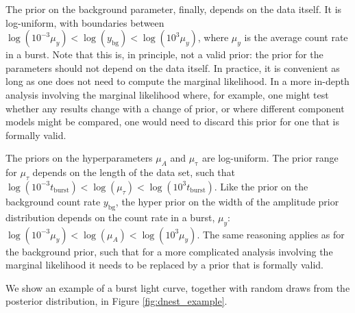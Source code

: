 \documentclass[12pt]{emulateapj}
\newcommand{\given}{\,|\,}
\newcommand{\counts}{y}
\newcommand{\pars}{\theta}
\newcommand{\mean}{\lambda}
\newcommand{\Poisson}{{\mathcal P}}
\newcommand{\bg}{\mathrm{bg}}
\begin{document}

The prior on the background parameter, finally, depends on the data itself. It is log-uniform, with boundaries between 
$\log{(10^{-3}\mu_\counts)} < \log{(\counts_{\mathrm{bg}})} < \log{(10^{3} \mu_\counts)}$, where $\mu_\counts$ is the average count
rate in a burst. Note that this is, in principle, not a valid prior: the prior for the parameters should not depend on the data
itself. In practice, it is convenient as long as one does not need to compute the marginal likelihood. In a more in-depth analysis
involving the marginal likelihood where, for example, one might test whether any results change with a change of prior, or where different component models
might be compared, one would need to discard this prior for one that is formally valid.

The priors on the hyperparameters $\mu_{A}$ and $\mu_{\mathrm{\tau}}$ are log-uniform. The prior range for
$\mu_{\tau}$ depends on the length of the data set, such that $\log{(10^{-3}t_{\mathrm{burst}})} < \log{(\mu_{\tau})} < \log{(10^{3}t_\mathrm{burst})}$.
Like the prior on the background count rate $\counts_{\mathrm{bg}}$, the hyper prior on the width of the amplitude prior distribution
depends on the count rate in a burst, $\mu_\counts$: $\log{(10^{-3}\mu_\counts)} < \log{(\mu_{A})} < \log{(10^{3} \mu_\counts)}$. The same reasoning applies as
for the background prior, such that for a more complicated analysis involving the marginal likelihood it needs to be replaced
by a prior that is formally valid.

We show an example of a burst light curve, together with random draws from the posterior distribution, in Figure \ref{fig:dnest_example}.



  
\end{document}
